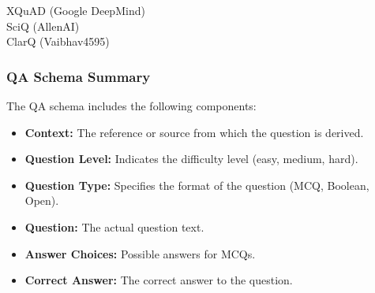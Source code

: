 \begin{description}
    \item[XQuAD (Google DeepMind)]
    
    \item[SciQ (AllenAI)]
    
    \item[ClarQ (Vaibhav4595)]
\end{description}

\subsubsection{QA Schema Summary}

The QA schema includes the following components:
\begin{itemize}
    \item \textbf{Context:} The reference or source from which the question is derived.
    \item \textbf{Question Level:} Indicates the difficulty level (easy, medium, hard).
    \item \textbf{Question Type:} Specifies the format of the question (MCQ, Boolean, Open).
    \item \textbf{Question:} The actual question text.
    \item \textbf{Answer Choices:} Possible answers for MCQs.
    \item \textbf{Correct Answer:} The correct answer to the question.
\end{itemize}

